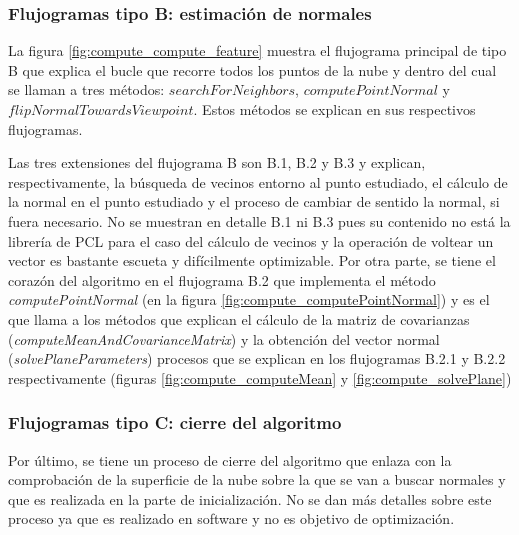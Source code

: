 \subsubsection{Flujogramas tipo B: estimación de normales}

La figura \ref{fig:compute_compute_feature} muestra el flujograma principal de tipo B que explica el bucle que recorre todos los puntos de la nube y dentro del cual se llaman a tres métodos: $searchForNeighbors$, $computePointNormal$ y $flipNormalTowardsViewpoint$. Estos métodos se explican en sus respectivos flujogramas.



Las tres extensiones del flujograma B son B.1, B.2 y B.3 y explican, respectivamente, la búsqueda de vecinos entorno al punto estudiado, el cálculo de la normal en el punto estudiado y el proceso de cambiar de sentido la normal, si fuera necesario. No se muestran en detalle B.1 ni B.3 pues su contenido no está la librería de PCL para el caso del cálculo de vecinos y la operación de voltear un vector es bastante escueta y difícilmente optimizable. Por otra parte, se tiene el corazón del algoritmo en el flujograma B.2 que implementa el método \textit{computePointNormal}\cite{calculo_compute_point_normal} (en la figura \ref{fig:compute_computePointNormal}) y es el que llama a los métodos que explican el cálculo de la matriz de covarianzas (\textit{computeMeanAndCovarianceMatrix}) y la obtención del vector normal (\textit{solvePlaneParameters}) procesos que se explican en los flujogramas B.2.1 y B.2.2 respectivamente (figuras \ref{fig:compute_computeMean} y \ref{fig:compute_solvePlane})




\subsubsection{Flujogramas tipo C: cierre del algoritmo}
Por último, se tiene un proceso de cierre del algoritmo que enlaza con la comprobación de la superficie de la nube sobre la que se van a buscar normales y que es realizada en la parte de inicialización. No se dan más detalles sobre este proceso ya que es realizado en software y no es objetivo de optimización.


